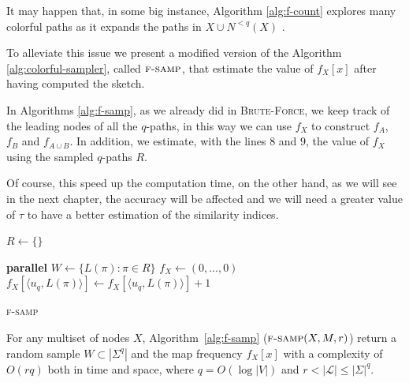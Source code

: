 \clearpage

It may happen that, in some big instance, Algorithm \ref{alg:f-count} explores many colorful paths as it expands the paths in $X \cup N^{<q}(X)$ .

To alleviate this issue we present a modified version of the Algorithm \ref{alg:colorful-sampler}, called $\textsc{f-samp}$, that estimate the value of $f_{X}[x]$ after having computed the sketch.\medskip

In Algorithms \ref{alg:f-samp}, as we already did in \textsc{Brute-Force}, we keep track of the leading nodes of all the $q$-paths, in this way we can use $f_{X}$ to construct $f_A$, $f_B$ and $f_{A \cup B}$. In addition, we estimate, with the lines $8$ and $9$, the value of $f_X$ using the sampled $q$-paths $R$.\medskip

Of course, this speed up the computation time, on the other hand, as we will see in the next chapter, the accuracy will be affected and we will need a greater value of $\tau$ to have a better estimation of the similarity indices.

\begin{algorithm}[h]
	\small
	\DontPrintSemicolon
	$R \gets \{\}$\;
		
	\BlankLine
	\textbf{parallel} 
	\BlankLine
	$W \gets \{ L(\pi) : \pi \in R \}$\;
	\BlankLine
	$f_X \gets (0,\ldots,0)$\;
	{
		$f_X[\langle u_{q}, L(\pi) \rangle ] \gets f_X[\langle u_{q}, L(\pi) \rangle]+1$
	}
	\BlankLine
	\caption{\textsc{f-samp}}
	\label{alg:f-samp}
\end{algorithm}

\begin{lemma}
	For any multiset of nodes $X$, 
	Algorithm~\ref{alg:f-samp} ($\textsc{f-samp}(X, M, r)$) return a random sample $W \subset |\Sigma^{q}|$ and the map frequency $f_{X}[x]$
	with a complexity of $O(rq)$ both in time and space, 
	where $q = O(\log |V|)$ and $r < |\mathcal{L}| \leq |\Sigma|^{q}$.
\end{lemma}

